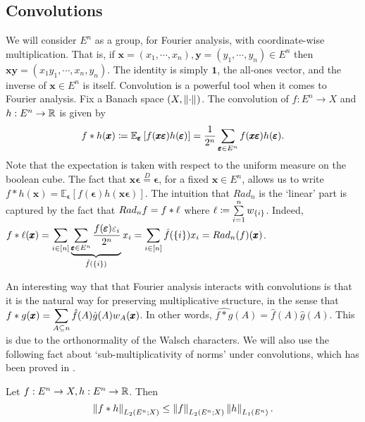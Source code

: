 \subsection*{Convolutions} We will consider $E^{n}$ as a group, for Fourier analysis, with coordinate-wise multiplication. That is, if $\pmb x=(x_{1},\cdots,x_{n}), \pmb y=(y_{1},\cdots,y_{n})\in E^{n}$ then $\pmb x\pmb y = (x_{1}y_{1},\cdots,x_{n},y_{n})$. The identity is simply $\pmb 1$, the all-ones vector, and the inverse of $\pmb x\in E^{n}$ is itself. Convolution is a powerful tool when it comes to Fourier analysis. Fix a Banach space $(X,\left\lVert \cdot \right\rVert_{})$. The convolution of $f:E^{n}\to X$ and $h:E^{n}\to \mathbb{R}$ is given by $$f\ast h (\pmb x)\coloneqq \mathbb E_{\pmb {\varepsilon}}\left[f(\pmb x \pmb {\varepsilon})h(\pmb {\varepsilon})\right] = \frac{1}{2^{n}} \sum_{\pmb {\varepsilon}\in E^{n}}f(\pmb x \pmb {\varepsilon})h(\pmb {\varepsilon}).$$
Note that the expectation is taken with respect to the uniform measure on the boolean cube. The fact that $\pmb x\pmb \epsilon \stackrel{D}{=} \pmb \epsilon$, for a fixed $\pmb x\in E^{n}$, allows us to write $f\ast h(\pmb x) = \mathbb E_{\pmb \epsilon}\left[f(\pmb \epsilon)h(\pmb x\pmb \epsilon)\right]$. The intuition that $Rad_{n}$ is the `linear' part is captured by the fact that $Rad_{n}f = f\ast \ell$ where $\ell \coloneqq \sum\limits_{i=1}^{n} w_{\left\{i\right\}}$. Indeed, $\displaystyle f\ast \ell(\pmb x) = \sum_{i\in[n]} \underbrace{\sum_{\pmb {\varepsilon}\in E^{n}}\frac{f(\pmb {\varepsilon})\varepsilon_{i}}{2^{n}}}_{\hat f(\left\{i\right\})}x_{i} = \sum_{i\in [n]} \hat f(\left\{i\right\})x_{i} = Rad_{n}(f)(\pmb x)$.

An interesting way that that Fourier analysis interacts with convolutions is that it is the natural way for preserving multiplicative structure, in the sense that $\displaystyle f*g(\pmb x) = \sum_{A\subseteq n} \hat f(A)\hat g(A)w_{A}(\pmb x)$. In other words, $\widehat{f*g}(A) = \hat f(A)\hat g(A)$. This is due to the orthonormality of the Walsch characters. We will also use the following fact about `sub-multiplicativity of norms' under convolutions, which has been proved in .

\begin{lemma}\label{lem:221}
Let $f:E^{n}\to X, h:E^{n}\to \mathbb{R}$. Then $$\left\lVert f\ast h \right\rVert_{L_{2}(E^{n};X)} \le \left\lVert f \right\rVert_{L_{2}(E^{n};X)}\left\lVert h \right\rVert_{L_{1}(E^{n})}.$$
\end{lemma}

